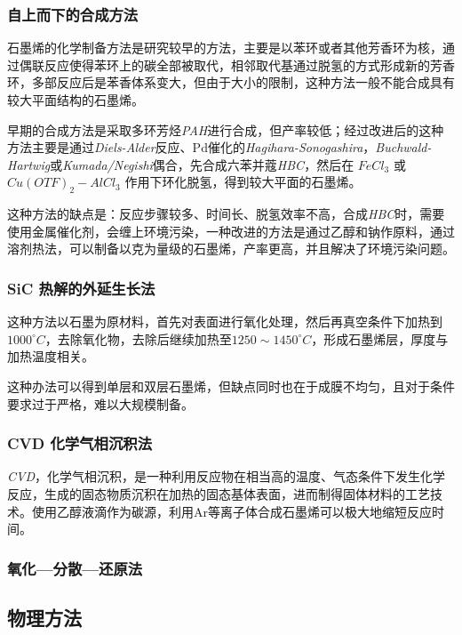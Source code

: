 \subsubsection{自上而下的合成方法}

石墨烯的化学制备方法是研究较早的方法，主要是以苯环或者其他芳香环为核，通过偶联反应使得苯环上的碳全部被取代，相邻取代基通过脱氢的方式形成新的芳香环，多部反应后是苯香体系变大，但由于大小的限制，这种方法一般不能合成具有较大平面结构的石墨烯。

早期的合成方法是采取多环芳烃\textit{PAH}进行合成，但产率较低；经过改进后的这种方法主要是通过\textit{Diels-Alder}反应、Pd催化的\textit{Hagihara-Sonogashira}，\textit{Buchwald-Hartwig}或\textit{Kumada/Negishi}偶合，先合成六苯并蔻\textit{HBC}，然后在 $FeCl_3$ 或 $Cu(OTF)_2-AlCl_3$ 作用下环化脱氢，得到较大平面的石墨烯。

这种方法的缺点是：反应步骤较多、时间长、脱氢效率不高，合成\textit{HBC}时，需要使用金属催化剂，会缠上环境污染，一种改进的方法是通过乙醇和钠作原料，通过溶剂热法，可以制备以克为量级的石墨烯，产率更高，并且解决了环境污染问题。

\subsubsection{SiC 热解的外延生长法}

这种方法以石墨为原材料，首先对表面进行氧化处理，然后再真空条件下加热到$1000^\circ C$，去除氧化物，去除后继续加热至$1250\sim 1450^\circ C$，形成石墨烯层，厚度与加热温度相关。

这种办法可以得到单层和双层石墨烯，但缺点同时也在于成膜不均匀，且对于条件要求过于严格，难以大规模制备。

\subsubsection{CVD 化学气相沉积法}

\textit{CVD}，化学气相沉积，是一种利用反应物在相当高的温度、气态条件下发生化学反应，生成的固态物质沉积在加热的固态基体表面，进而制得固体材料的工艺技术。使用乙醇液滴作为碳源，利用Ar等离子体合成石墨烯可以极大地缩短反应时间。

\subsubsection{氧化—分散—还原法}



\subsection{物理方法}


